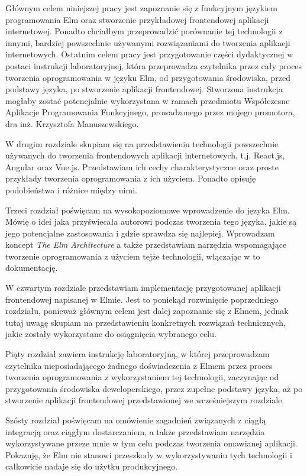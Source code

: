 \documentclass[twoside,a4paper]{report}
\begin{document}
Głównym celem niniejszej pracy jest zapoznanie się z funkcyjnym językiem programowania Elm oraz stworzenie przykładowej frontendowej aplikacji internetowej.
Ponadto chciałbym przeprowadzić porównanie tej technologii z innymi, bardziej powszechnie używanymi rozwiązaniami do tworzenia aplikacji internetowych.
Ostatnim celem pracy jest przygotowanie części dydaktycznej w postaci instrukcji laboratoryjnej, która przeprowadza czytelnika przez cały proces tworzenia oprogramowania w języku Elm, od przygotowania środowiska, przed podstawy języka, po stworzenie aplikacji frontendowej.
Stworzona instrukcja mogłaby zostać potencjalnie wykorzystana w ramach przedmiotu Współczesne Aplikacje Programowania Funkcyjnego, prowadzonego przez mojego promotora, dra inż. Krzysztofa Manuszewskiego.

W drugim rozdziale skupiam się na przedstawieniu technologii powszechnie używanych do tworzenia frontendowych aplikacji internetowych, t.j. React.js, Angular oraz Vue.js.
Przedstawiam ich cechy charakterystyczne oraz proste przykłady tworzenia oprogramowania z ich użyciem.
Ponadto opisuję podobieństwa i różnice między nimi.

Trzeci rozdział poświęcam na wysokopoziomowe wprowadzenie do języka Elm.
Mówię o idei jaka przyświecała autorowi podczas tworzenia tego języka, jakie są jego potencjalne zastosowania i gdzie sprawdza się najlepiej.
Wprowadzam koncept \textit{The Elm Architecture} a także przedstawiam narzędzia wspomagające tworzenie oprogramowania z użyciem tejże technologii, włączając w to dokumentację.

W czwartym rozdziale przedstawiam implementację przygotowanej aplikacji frontendowej napisanej w Elmie.
Jest to poniekąd rozwinięcie poprzedniego rozdziału, ponieważ głównym celem jest dalej zapoznanie się z Elmem, jednak tutaj uwagę skupiam na przedstawieniu konkretnych rozwiązań technicznych, jakie zostały wykorzystane do osiągnięcia wybranego celu.

Piąty rozdział zawiera instrukcję laboratoryjną, w której przeprowadzam czytelnika nieposiadającego żadnego doświadczenia z Elmem przez proces tworzenia oprogramowania z wykorzystaniem tej technologii, zaczynając od przygotowania środowiska deweloperskiego, przez zupełne podstawy języka, aż po stworzenie aplikacji frontendowej przedstawionej we wcześniejszym rozdziale.

Szósty rozdział poświęcam na omówienie zagadnień związanych z ciągłą integracją oraz ciągłym dostarczaniem, a także przedstawiam narzędzia wykorzystywane przeze mnie w tym celu podczas tworzenia omawianej aplikacji.
Pokazuję, że Elm nie stanowi przeszkody w wykorzystywaniu tych technologii i całkowicie nadaje się do użytku produkcyjnego.
\end{document}
